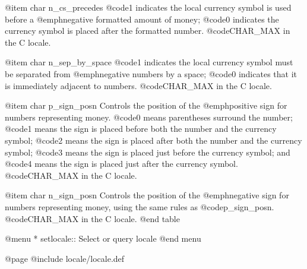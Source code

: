 @item char n_cs_precedes
@code{1} indicates the local currency symbol is used before a
@emph{negative} formatted amount of money; @code{0} indicates
the currency symbol is placed after the formatted number.
@code{CHAR_MAX} in the C locale. 

@item char n_sep_by_space
@code{1} indicates the local currency symbol must be separated from
@emph{negative} numbers by a space; @code{0} indicates that it
is immediately adjacent to numbers.
@code{CHAR_MAX} in the C locale. 

@item char p_sign_posn
Controls the position of the @emph{positive} sign for
numbers representing money.  @code{0} means parentheses surround the
number; @code{1} means the sign is placed before both the number and the
currency symbol; @code{2} means the sign is placed after both the number
and the currency symbol; @code{3} means the sign is placed just before
the currency symbol; and @code{4} means the sign is placed just after
the currency symbol.
@code{CHAR_MAX} in the C locale. 

@item char n_sign_posn
Controls the position of the @emph{negative} sign for numbers
representing money, using the same rules as @code{p_sign_posn}.
@code{CHAR_MAX} in the C locale. 
@end table

@menu
* setlocale::  Select or query locale
@end menu

@page
@include locale/locale.def
